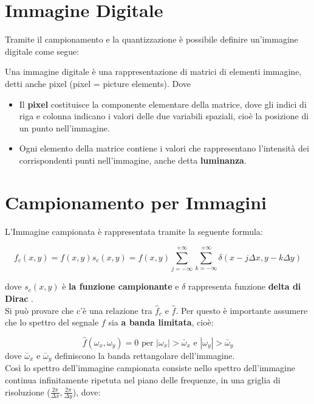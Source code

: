 \section{Immagine Digitale}
Tramite il campionamento e la quantizzazione è possibile definire un'immagine
digitale come segue:
\begin{definition}
    Una immagine digitale è una rappresentazione di matrici di elementi
    immagine, detti anche pixel (pixel = picture elements). Dove

    \begin{itemize}
        \item Il \textbf{pixel} costituisce la componente elementare della matrice,
              dove gli indici di riga e colonna indicano i valori delle due
              variabili spaziali, cioè la posizione di un punto nell'immagine.
        \item Ogni elemento della matrice contiene i valori che rappresentano
              l'intensità dei corrispondenti punti nell'immagine, anche detta
              \textbf{luminanza}.
    \end{itemize}
\end{definition}

\section{Campionamento per Immagini}
L'Immagine campionata è rappresentata tramite la seguente formula:

$$
    f_c(x,y) = f(x,y)s_c(x,y)=f(x,y)\sum_{j=-\infty}^{+\infty}
    \sum_{k=-\infty}^{+\infty} \delta (x-j \Delta x, y-k \Delta y)
$$

dove $s_c(x,y)$ è \textbf{la funzione campionante} e $\delta$ rappresenta
funzione \textbf{delta di Dirac} .\\

Si può provare che c'è una relazione tra $\hat{f}_c$ e $\hat{f}$. Per questo è
importante assumere che lo spettro del segnale $f$ sia \textbf{a banda
    limitata}, cioè:

$$
    \hat{f}(\omega_x, \omega_y)=0 \text{ per } |\omega_x| > \bar{\omega}_x \text{ e } |\omega_y| > \bar{\omega}_y
$$
dove $\bar{\omega}_x$ e $\bar{\omega}_y$ definiscono la banda rettangolare dell'immagine.\\

Così lo spettro dell'immagine campionata consiste nello spettro dell'immagine
continua infinitamente ripetuta nel piano delle frequenze, in una griglia di
risoluzione ($\frac{2\pi}{\Delta x}, \frac{2 \pi}{\Delta y}$), dove:

